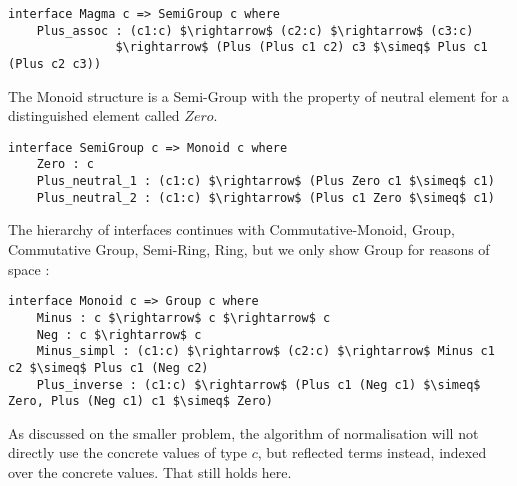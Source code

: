 \begin{lstlisting}
interface Magma c => SemiGroup c where
    Plus_assoc : (c1:c) $\rightarrow$ (c2:c) $\rightarrow$ (c3:c) 
               $\rightarrow$ (Plus (Plus c1 c2) c3 $\simeq$ Plus c1 (Plus c2 c3))
\end{lstlisting}

The Monoid structure is a Semi-Group with the property of neutral element for a distinguished element called $Zero$.

\begin{lstlisting}
interface SemiGroup c => Monoid c where
    Zero : c    
    Plus_neutral_1 : (c1:c) $\rightarrow$ (Plus Zero c1 $\simeq$ c1)    
    Plus_neutral_2 : (c1:c) $\rightarrow$ (Plus c1 Zero $\simeq$ c1)
\end{lstlisting}

The hierarchy of interfaces continues with Commutative-Monoid, Group, Commutative Group, Semi-Ring, Ring, but we only show Group for reasons of space :

\begin{lstlisting}
interface Monoid c => Group c where
    Minus : c $\rightarrow$ c $\rightarrow$ c
    Neg : c $\rightarrow$ c
    Minus_simpl : (c1:c) $\rightarrow$ (c2:c) $\rightarrow$ Minus c1 c2 $\simeq$ Plus c1 (Neg c2) 
    Plus_inverse : (c1:c) $\rightarrow$ (Plus c1 (Neg c1) $\simeq$ Zero, Plus (Neg c1) c1 $\simeq$ Zero)
\end{lstlisting}

As discussed on the smaller problem, the algorithm of normalisation will not directly use the concrete values of type $c$, but reflected terms instead, indexed over the concrete values. That still holds here.
